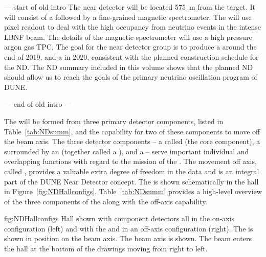 --- start of old intro
The near detector will be located \SI{575}{m} from the target. It will consist of a \lartpc followed by a fine-grained magnetic spectrometer. The \lartpc will use pixel readout to deal with the high occupancy from neutrino events in the intense LBNF beam. The details of the magnetic spectrometer will use a high pressure argon gas TPC.
The goal for the near detector group is to produce a  around the end of 2019, and a  in 2020, consistent with the planned construction schedule for the ND. The ND summary included in this volume shows that the planned ND should allow us to reach the goals of the primary neutrino oscillation program of DUNE.
 
 --- end of old intro ---

The   will be formed from three primary detector components, listed in Table~\ref{tab:NDsumm}, and the capability for two of these components to move off the beam axis.  The three detector components -- a  called  (the core component), a  surrounded by an  (together called a ), and a  -- serve important individual and overlapping functions with regard to the mission of the .  %
The movement off axis, called , provides a valuable extra degree of freedom in the data and  is an integral part of the DUNE Near Detector concept.
The   is shown schematically in the   hall in Figure~\ref{fig:NDHallconfigs}.  Table~\ref{tab:NDsumm} provides a high-level overview of the three components of the   along with the off-axis capability.  

\begin{dunefigure}
{fig:NDHallconfigs}
{  Hall shown with component detectors all in the on-axis configuration (left) and with the  and  in an off-axis configuration (right). The  is shown in position on the beam axis. The beam axis is shown.  The beam enters the hall at the bottom of the drawings moving from right to left.}
\end{dunefigure}

